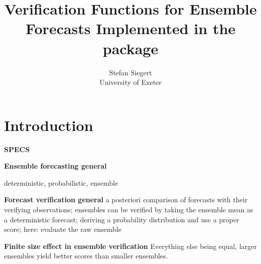 \documentclass[article]{jss}
\author{Stefan Siegert\\University of Exeter}
\title{Verification Functions for Ensemble Forecasts Implemented in the \proglang{R} package \pkg{SpecsVerification}}
\begin{document}



\section{Introduction}

{\bf SPECS}

{\bf Ensemble forecasting general}

deterministic, probabilistic, ensemble


{\bf Forecast verification general}
a posteriori comparison of forecasts with their verifying observations;
ensembles can be verified by taking the ensemble mean as a deterministic forecast; deriving a probability distribution and use a proper score; here: evaluate the raw ensemble

{\bf Finite size effect in ensemble verification}
Everything else being equal, larger ensembles yield better scores than smaller ensembles.
\end{document}
